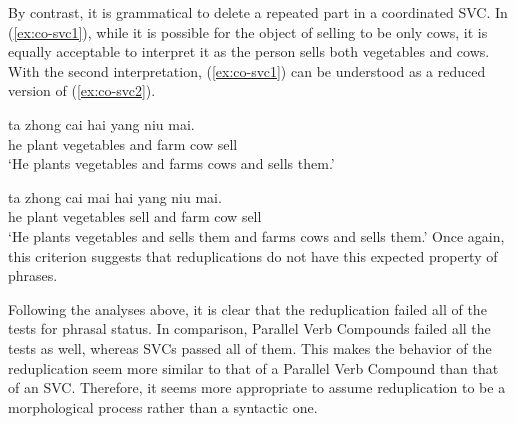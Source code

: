 \ea\label{ex:co-pvc}
    
    \z
\z

By contrast, it is grammatical to delete a repeated part in a coordinated {SVC}. 
In (\ref{ex:co-svc1}), while it is possible for the object of selling to be only cows, it is equally acceptable to interpret it as the person sells both vegetables and cows. With the second interpretation, (\ref{ex:co-svc1}) can be understood as a reduced version of (\ref{ex:co-svc2}).

\ea
  \ea\label{ex:co-svc1}
  \gll ta zhong cai hai yang niu mai.\\
  he plant vegetables and farm cow sell\\
  \glt `He plants vegetables and farms cows and sells them.'
  
  \ex\label{ex:co-svc2}
  \gll ta zhong cai mai hai yang niu mai.\\
  he plant vegetables sell and farm cow sell\\
  \glt `He plants vegetables and sells them and farms cows and sells them.'
   \z
\z
Once again, this criterion suggests that reduplications do not have this expected property of phrases.


Following the analyses above, it is clear that the reduplication failed all of the tests for phrasal status. 
In comparison, Parallel Verb Compounds failed all the tests as well, whereas {SVC}s passed all of them.
This makes the behavior of the reduplication seem more similar to that of a Parallel Verb Compound than that of an {SVC}.
Therefore, it seems more appropriate to assume reduplication to be a morphological process rather than a syntactic one. 




